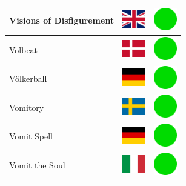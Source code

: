 \documentclass[12pt, a4paper, twoside]{report}
\begin{document}
\begin{center}
\begin{longtable}{|p{5cm}|p{2cm}|p{2cm}|}
 Visions of Disfigurement                                   & \includegraphics[width=1cm]{../4x3/gb} &   \includegraphics[width=1cm]{../likes/y} \\ \hline
 Volbeat                                                    & \includegraphics[width=1cm]{../4x3/dk} &   \includegraphics[width=1cm]{../likes/y} \\ \hline
 Völkerball                                                 & \includegraphics[width=1cm]{../4x3/de} &   \includegraphics[width=1cm]{../likes/y} \\ \hline
 Vomitory                                                   & \includegraphics[width=1cm]{../4x3/se} &   \includegraphics[width=1cm]{../likes/y} \\ \hline
 Vomit Spell                                                & \includegraphics[width=1cm]{../4x3/de} &   \includegraphics[width=1cm]{../likes/y} \\ \hline
 Vomit the Soul                                             & \includegraphics[width=1cm]{../4x3/it} &   \includegraphics[width=1cm]{../likes/y} \\ \hline

\end{longtable}
\end{center}
\end{document}
